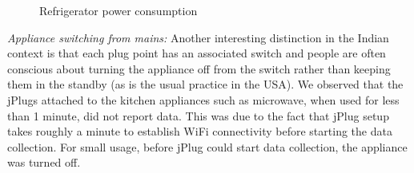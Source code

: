 \documentclass[10pt]{sensys-proc}
\begin{document}
\begin{figure}[t!]
\vspace{-2mm}
       
   \vspace{-3mm}
    \caption{Refrigerator power consumption}
    \label{fig:metadata}
    \vspace{-4mm}

\end{figure}
	

\emph{Appliance switching from mains:} Another interesting distinction in the Indian context is that each plug point has an associated switch and people are often conscious about turning the appliance off from the switch rather than keeping them in the standby (as is the usual practice in the USA). We observed that the jPlugs attached to the kitchen appliances such as microwave, when used for less than 1 minute, did not report data. This was due to the fact that jPlug setup takes roughly a minute to establish WiFi connectivity before starting the data collection. For small usage, before jPlug could start data collection, the appliance was turned off.
\end{document}

